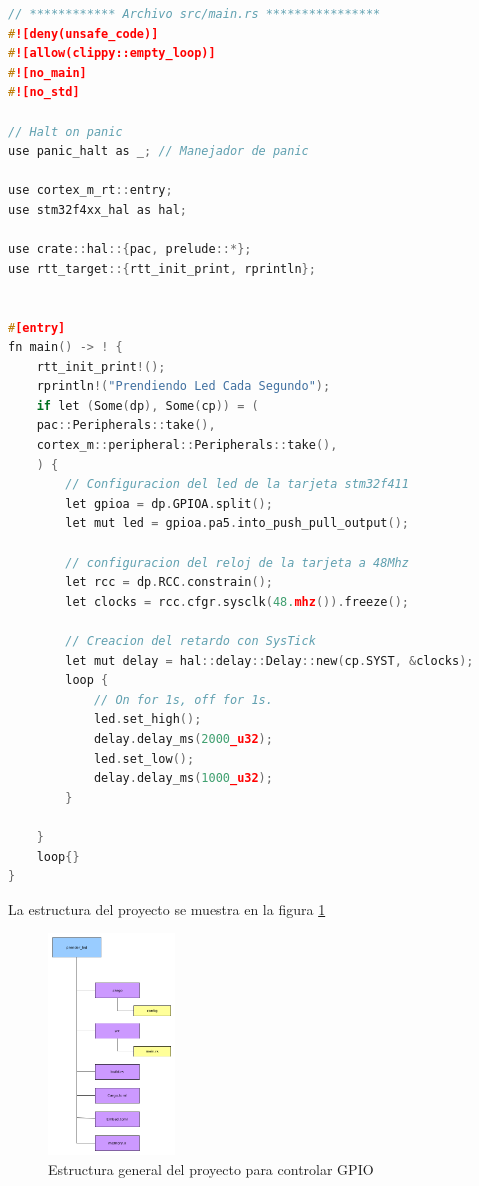 \begin{lstlisting}[language=c]
// ************ Archivo src/main.rs ****************
#![deny(unsafe_code)]
#![allow(clippy::empty_loop)]
#![no_main]
#![no_std]

// Halt on panic
use panic_halt as _; // Manejador de panic 

use cortex_m_rt::entry;
use stm32f4xx_hal as hal;

use crate::hal::{pac, prelude::*};
use rtt_target::{rtt_init_print, rprintln};


#[entry]
fn main() -> ! {
	rtt_init_print!();
	rprintln!("Prendiendo Led Cada Segundo");
	if let (Some(dp), Some(cp)) = (
	pac::Peripherals::take(),
	cortex_m::peripheral::Peripherals::take(),
	) {
		// Configuracion del led de la tarjeta stm32f411 
		let gpioa = dp.GPIOA.split();
		let mut led = gpioa.pa5.into_push_pull_output();
		
		// configuracion del reloj de la tarjeta a 48Mhz
		let rcc = dp.RCC.constrain();
		let clocks = rcc.cfgr.sysclk(48.mhz()).freeze();
		
		// Creacion del retardo con SysTick
		let mut delay = hal::delay::Delay::new(cp.SYST, &clocks);
		loop {
			// On for 1s, off for 1s.
			led.set_high();
			delay.delay_ms(2000_u32);
			led.set_low();
			delay.delay_ms(1000_u32);
		}       
		
	}
	loop{}
}
\end{lstlisting}

La estructura del proyecto se muestra en la figura \ref{cap3:001}

\begin{figure}[htb]
	\centering
	\includegraphics[width=0.3\textwidth]{capitulo3/prender_led.png}
	\caption{Estructura general del proyecto para controlar GPIO}
	\label{cap3:001}
\end{figure} 


